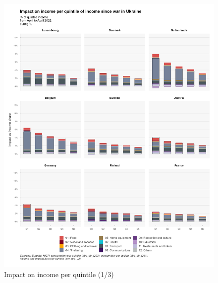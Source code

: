 \documentclass[
  9pt,
  a4paper,
  DIV=11,
  numbers=noendperiod,
  oneside]{scrartcl}
\begin{document}
\begin{figure}

\caption{Impact on income per quintile (1/3)}

{\centering \includegraphics[width=17cm,height=\textheight]{../svg/coicop_l1_1y_1.png}

}

\end{figure}
\end{document}
